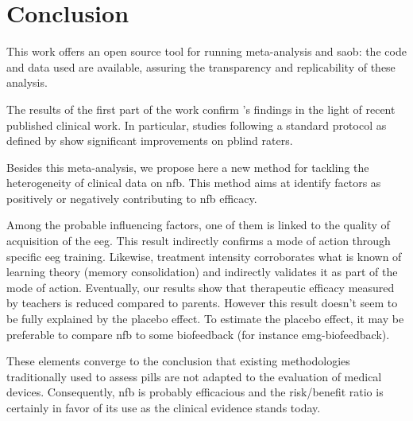 

\section{Conclusion}

This work offers an open source tool for running meta-analysis and \gls{saob}: the code and data used are available, 
assuring the transparency and replicability of these analysis. 

The results of the first part of the work confirm \citet{Cortese2016}'s findings in the light of recent published clinical work.
In particular, studies following a standard protocol as defined by \citet{Anrs2014} show significant improvements on \gls{pblind}
raters.

Besides this meta-analysis, we propose here a new method for tackling the heterogeneity of clinical data on \gls{nfb}. This method aims at identify factors 
as positively or negatively contributing to \gls{nfb} efficacy. 

Among the probable influencing factors, one of them is linked to the quality
of acquisition of the \gls{eeg}. This result indirectly confirms a mode of action through specific \gls{eeg} training.
Likewise, treatment intensity corroborates what is known of learning theory (memory consolidation) and indirectly validates it as
part of the mode of action. Eventually, our results show that therapeutic efficacy measured by teachers is reduced compared to parents.
However this result doesn't seem to be fully explained by the placebo effect. To estimate the placebo effect, it may be preferable to compare \gls{nfb}
to some biofeedback (for instance \gls{emg}-biofeedback). 

These elements converge to the conclusion that existing methodologies traditionally used to assess pills are not adapted to the evaluation 
of medical devices. Consequently, \gls{nfb} is probably efficacious and the risk/benefit ratio is certainly in favor of its use as the
clinical evidence stands today.
